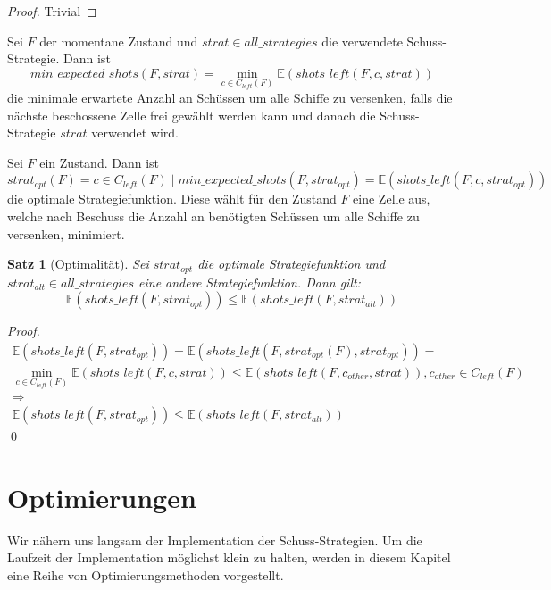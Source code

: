 \documentclass[a4paper,12pt]{llncs}
\numberwithin{equation}{section}
\newtheorem{satz}{Satz}
\begin{document}
\begin{proof}
Trivial
\end{proof}

\begin{definition}
Sei $F$ der momentane Zustand und $strat \in all\_strategies$ die verwendete Schuss-Strategie.
Dann ist
\[
min\_expected\_shots(F, strat)=\min_{c \in C_{left}(F)} \mathds{E}(shots\_left(F, c, strat))
\]
die minimale erwartete Anzahl an Schüssen um alle Schiffe zu versenken, falls die nächste beschossene Zelle frei gewählt werden kann und danach die Schuss-Strategie $strat$ verwendet wird.
\end{definition}

\begin{definition}
Sei $F$ ein Zustand.
Dann ist
\[
strat_{opt}(F)=c \in C_{left}(F) \mid min\_expected\_shots(F, strat_{opt})= \mathds{E}(shots\_left(F, c, strat_{opt}))
\]
die optimale Strategiefunktion.
Diese wählt für den Zustand $F$ eine Zelle aus, welche nach Beschuss die Anzahl an benötigten Schüssen um alle Schiffe zu versenken, minimiert.
\end{definition}

\begin{satz}[Optimalität]
Sei $strat_{opt}$ die optimale Strategiefunktion und $strat_{alt} \in all\_strategies$ eine andere Strategiefunktion.
Dann gilt:
\[
\mathds{E}(shots\_left(F, strat_{opt})) \leq \mathds{E}(shots\_left(F, strat_{alt}))
\]
\end{satz}

\begin{proof}
\begin{align}
\mathds{E}(shots\_left(F, strat_{opt})) =\mathds{E}(shots\_left(F, strat_{opt}(F), strat_{opt}))=\\
\min_{c \in C_{left}(F)} \mathds{E}(shots\_left(F, c, strat)) \leq \mathds{E}(shots\_left(F, c_{other}, strat)), c_{other} \in C_{left}(F)\\
\Rightarrow\\
\mathds{E}(shots\_left(F, strat_{opt})) \leq \mathds{E}(shots\_left(F, strat_{alt}))
\end{align}
\qed
\end{proof}

\newpage

\section{Optimierungen}

Wir nähern uns langsam der Implementation der Schuss-Strategien.
Um die Laufzeit der Implementation möglichst klein zu halten, werden in diesem Kapitel eine Reihe von Optimierungsmethoden vorgestellt.
\end{document}
